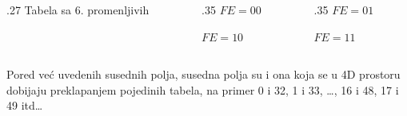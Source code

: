 \begin{frame}[t,label=02-s038]
\gusttekst
\setlength{\parskip}{1pt}
\begin{columns}[c,onlytextwidth]
\begin{column}{.27\textwidth}
Tabela sa 6. promenljivih
\end{column}
\begin{column}{.35\textwidth}\centering
\(FE=00\)\par
\par
\(FE=10\)\par

\end{column}
\begin{column}{.35\textwidth}\centering
\(FE=01\)\par
\par
\(FE=11\)\par

\end{column}
\end{columns}

Pored već uvedenih susednih polja, susedna polja su i ona koja se u 4D prostoru dobijaju preklapanjem pojedinih tabela, na primer 0 i 32, 1 i 33, \ldots, 16 i 48, 17 i 49 itd\ldots
\end{frame}
